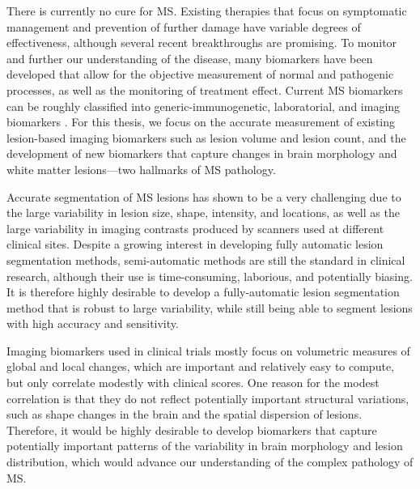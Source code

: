 There is currently no cure for MS. Existing therapies that focus on symptomatic
management and prevention of further damage have variable degrees of
effectiveness, although several recent breakthroughs are promising. To monitor
and further our understanding of the disease, many biomarkers have been
developed that allow for the objective measurement of normal and pathogenic
processes, as well as the monitoring of treatment effect. Current MS biomarkers
can be roughly classified into generic-immunogenetic, laboratorial, and imaging
biomarkers \citep{katsavos2013}. For this thesis, we focus on the accurate
measurement of existing lesion-based imaging biomarkers such as lesion volume
and lesion count, and the development of new biomarkers that capture changes in
brain morphology and white matter lesions---two hallmarks of MS pathology.

Accurate segmentation of MS lesions has shown to be a very challenging due to
the large variability in lesion size, shape, intensity, and locations, as well
as the large variability in imaging contrasts produced by scanners used at
different clinical sites. Despite a growing interest in developing fully
automatic lesion segmentation methods, semi-automatic methods are still the
standard in clinical research, although their use is time-consuming,
laborious, and potentially biasing. It is therefore highly desirable to develop
a fully-automatic lesion segmentation method that is robust to large
variability, while still being able to segment lesions with high accuracy and
sensitivity.

%

Imaging biomarkers used in clinical trials mostly focus on volumetric measures
of global and local changes, which are important and relatively easy to compute,
but only correlate modestly with clinical scores. One reason for the modest
correlation is that they do not reflect potentially important structural
variations, such as shape changes in the brain and the spatial dispersion of
lesions. Therefore, it would be highly desirable to develop biomarkers that
capture potentially important patterns of the variability in brain morphology
and lesion distribution, which would advance our understanding of the complex
pathology of MS.

